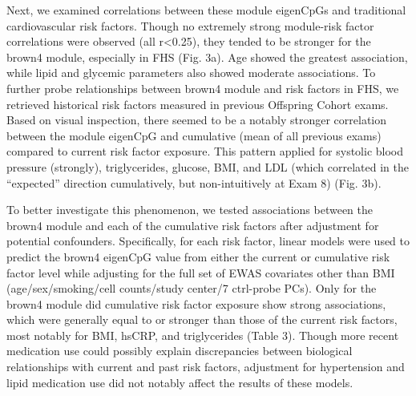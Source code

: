 \documentclass[]{article}
\theoremstyle{definition}
\theoremstyle{definition}
\theoremstyle{definition}
\theoremstyle{remark}
\begin{document}
Next, we examined correlations between these module eigenCpGs and
traditional cardiovascular risk factors. Though no extremely strong
module-risk factor correlations were observed (all
\textbar{}r\textbar{}\textless{}0.25), they tended to be stronger for
the brown4 module, especially in FHS (Fig. 3a). Age showed the greatest
association, while lipid and glycemic parameters also showed moderate
associations. To further probe relationships between brown4 module and
risk factors in FHS, we retrieved historical risk factors measured in
previous Offspring Cohort exams. Based on visual inspection, there
seemed to be a notably stronger correlation between the module eigenCpG
and cumulative (mean of all previous exams) compared to current risk
factor exposure. This pattern applied for systolic blood pressure
(strongly), triglycerides, glucose, BMI, and LDL (which correlated in
the ``expected'' direction cumulatively, but non-intuitively at Exam 8)
(Fig. 3b).

To better investigate this phenomenon, we tested associations between
the brown4 module and each of the cumulative risk factors after
adjustment for potential confounders. Specifically, for each risk
factor, linear models were used to predict the brown4 eigenCpG value
from either the current or cumulative risk factor level while adjusting
for the full set of EWAS covariates other than BMI (age/sex/smoking/cell
counts/study center/7 ctrl-probe PCs). Only for the brown4 module did
cumulative risk factor exposure show strong associations, which were
generally equal to or stronger than those of the current risk factors,
most notably for BMI, hsCRP, and triglycerides (Table 3). Though more
recent medication use could possibly explain discrepancies between
biological relationships with current and past risk factors, adjustment
for hypertension and lipid medication use did not notably affect the
results of these models.
\end{document}
